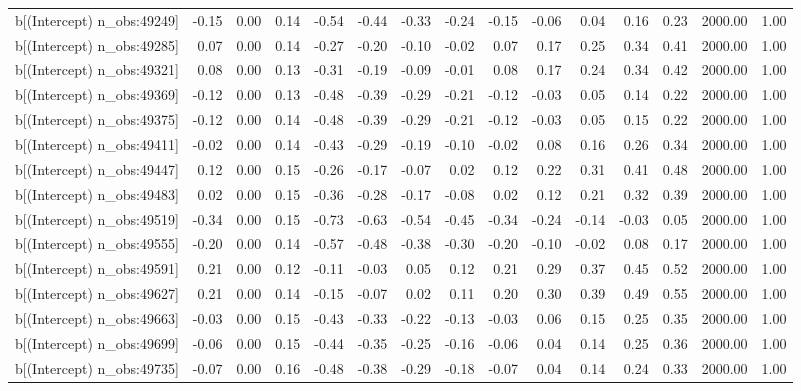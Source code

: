 \begin{table}[ht]
\begin{tabular}{rrrrrrrrrrrrrrr}
  b[(Intercept) n\_obs:49249] & -0.15 & 0.00 & 0.14 & -0.54 & -0.44 & -0.33 & -0.24 & -0.15 & -0.06 & 0.04 & 0.16 & 0.23 & 2000.00 & 1.00 \\ 
  b[(Intercept) n\_obs:49285] & 0.07 & 0.00 & 0.14 & -0.27 & -0.20 & -0.10 & -0.02 & 0.07 & 0.17 & 0.25 & 0.34 & 0.41 & 2000.00 & 1.00 \\ 
  b[(Intercept) n\_obs:49321] & 0.08 & 0.00 & 0.13 & -0.31 & -0.19 & -0.09 & -0.01 & 0.08 & 0.17 & 0.24 & 0.34 & 0.42 & 2000.00 & 1.00 \\ 
  b[(Intercept) n\_obs:49369] & -0.12 & 0.00 & 0.13 & -0.48 & -0.39 & -0.29 & -0.21 & -0.12 & -0.03 & 0.05 & 0.14 & 0.22 & 2000.00 & 1.00 \\ 
  b[(Intercept) n\_obs:49375] & -0.12 & 0.00 & 0.14 & -0.48 & -0.39 & -0.29 & -0.21 & -0.12 & -0.03 & 0.05 & 0.15 & 0.22 & 2000.00 & 1.00 \\ 
  b[(Intercept) n\_obs:49411] & -0.02 & 0.00 & 0.14 & -0.43 & -0.29 & -0.19 & -0.10 & -0.02 & 0.08 & 0.16 & 0.26 & 0.34 & 2000.00 & 1.00 \\ 
  b[(Intercept) n\_obs:49447] & 0.12 & 0.00 & 0.15 & -0.26 & -0.17 & -0.07 & 0.02 & 0.12 & 0.22 & 0.31 & 0.41 & 0.48 & 2000.00 & 1.00 \\ 
  b[(Intercept) n\_obs:49483] & 0.02 & 0.00 & 0.15 & -0.36 & -0.28 & -0.17 & -0.08 & 0.02 & 0.12 & 0.21 & 0.32 & 0.39 & 2000.00 & 1.00 \\ 
  b[(Intercept) n\_obs:49519] & -0.34 & 0.00 & 0.15 & -0.73 & -0.63 & -0.54 & -0.45 & -0.34 & -0.24 & -0.14 & -0.03 & 0.05 & 2000.00 & 1.00 \\ 
  b[(Intercept) n\_obs:49555] & -0.20 & 0.00 & 0.14 & -0.57 & -0.48 & -0.38 & -0.30 & -0.20 & -0.10 & -0.02 & 0.08 & 0.17 & 2000.00 & 1.00 \\ 
  b[(Intercept) n\_obs:49591] & 0.21 & 0.00 & 0.12 & -0.11 & -0.03 & 0.05 & 0.12 & 0.21 & 0.29 & 0.37 & 0.45 & 0.52 & 2000.00 & 1.00 \\ 
  b[(Intercept) n\_obs:49627] & 0.21 & 0.00 & 0.14 & -0.15 & -0.07 & 0.02 & 0.11 & 0.20 & 0.30 & 0.39 & 0.49 & 0.55 & 2000.00 & 1.00 \\ 
  b[(Intercept) n\_obs:49663] & -0.03 & 0.00 & 0.15 & -0.43 & -0.33 & -0.22 & -0.13 & -0.03 & 0.06 & 0.15 & 0.25 & 0.35 & 2000.00 & 1.00 \\ 
  b[(Intercept) n\_obs:49699] & -0.06 & 0.00 & 0.15 & -0.44 & -0.35 & -0.25 & -0.16 & -0.06 & 0.04 & 0.14 & 0.25 & 0.36 & 2000.00 & 1.00 \\ 
  b[(Intercept) n\_obs:49735] & -0.07 & 0.00 & 0.16 & -0.48 & -0.38 & -0.29 & -0.18 & -0.07 & 0.04 & 0.14 & 0.24 & 0.33 & 2000.00 & 1.00 \\ 

\end{tabular}
\end{table}
